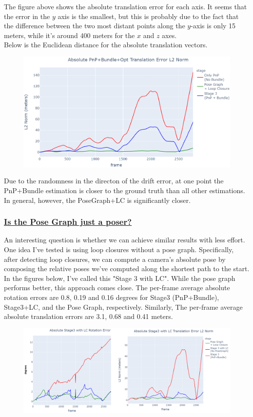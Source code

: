 \documentclass[12pt]{article}
\begin{document}
The figure above shows the absolute translation error for each axis. It seems that the error in the $y$ axis is the smallest, but this is probably due to the fact that the difference between the two most distant points along the $y$-axis is only 15 meters, while it's around 400 meters for the $x$ and $z$ axes.
\\ Below is the Euclidean distance for the absolute translation vectors.
\begin{figure}[H]
\includegraphics[width=\textwidth]{Absolute PnP+Bundle+Opt Translation Error L2 Norm}
\end{figure}

Due to the randomness in the directon of the drift error, at one point the PnP+Bundle estimation is closer to the ground truth than all other estimations. In general, however, the PoseGraph+LC is significantly closer. 
\subsubsection*{\underline{Is the Pose Graph just a poser?}}
An interesting question is whether we can achieve similar results with less effort. One idea I've tested is using loop closures without a pose graph. Specifically, after detecting loop closures, we can compute a camera's absolute pose by composing the relative poses we've computed along the shortest path to the start. In the figures below, I've called this "Stage 3 with LC". While the pose graph performs better, this approach comes close.
The per-frame average absolute rotation errors are 0.8, 0.19 and 0.16 degrees for Stage3 (PnP+Bundle), Stage3+LC, and the Pose Graph, respectively. Similarly, The per-frame average absolute translation errors are 3.1, 0.68 and 0.41 meters. 
\begin{figure}[H]
\includegraphics[width=\textwidth]{Stage3 With LC}
\end{figure}
\end{document}
